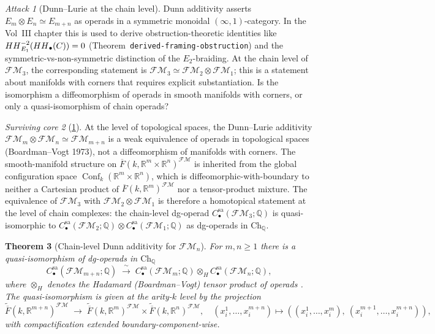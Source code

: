 \documentclass[11pt]{article}
\newtheorem{theorem}{Theorem}[section]
\theoremstyle{definition}
\theoremstyle{remark}
\newtheorem{attack}[theorem]{Attack}
\newtheorem{survivor}[theorem]{Surviving core}
\DeclareMathOperator{\Conf}{Conf}
\DeclareMathOperator{\HH}{HH}
\newcommand{\FMbar}{\overline{F}}
\newcommand{\FM}{\mathcal{FM}}
\newcommand{\Etwo}{E_2}
\begin{document}
\begin{attack}[Dunn--Lurie at the chain level]
\label{att:cycle-9}
Dunn additivity \cite[Dunn 1988; Lurie \emph{HA} 5.1.2.2]{Dunn1988, LurieHA}
asserts $E_m \otimes E_n \simeq E_{m+n}$ as operads in a symmetric
monoidal $(\infty, 1)$-category. In the Vol~III chapter this is used
to derive obstruction-theoretic identities like
$\HH^{-2}_{E_1}(\HH_\bullet(\cC)) = 0$ (Theorem~\texttt{derived-framing-obstruction})
and the symmetric-vs-non-symmetric distinction of the $\Etwo$-braiding.
At the chain level of $\FM_3$, the corresponding statement is
$\FM_3 \simeq \FM_2 \otimes \FM_1$; this is a statement about manifolds
with corners that requires explicit substantiation. Is the isomorphism
a diffeomorphism of operads in smooth manifolds with corners, or only
a quasi-isomorphism of chain operads?
\end{attack}

\begin{survivor}[\ref{att:cycle-9}]
At the level of topological spaces, the Dunn--Lurie additivity
$\FM_m \otimes \FM_n \simeq \FM_{m+n}$ is a weak equivalence of
operads in topological spaces (Boardman--Vogt 1973), not a
diffeomorphism of manifolds with corners. The smooth-manifold
structure on $\FMbar(k, \mathbb{R}^m \times \mathbb{R}^n)^{\FM}$
is inherited from the global configuration space
$\Conf_k(\mathbb{R}^m \times \mathbb{R}^n)$, which is
diffeomorphic-with-boundary to neither a Cartesian product of
$\FMbar(k, \mathbb{R}^m)^{\FM}$ nor a tensor-product mixture.
The equivalence of $\FM_3$ with $\FM_2 \otimes \FM_1$ is therefore a
homotopical statement at the level of chain complexes: the
chain-level dg-operad $C^{\mathrm{sa}}_\bullet(\FM_3; \mathbb{Q})$ is
quasi-isomorphic to $C^{\mathrm{sa}}_\bullet(\FM_2; \mathbb{Q}) \otimes
C^{\mathrm{sa}}_\bullet(\FM_1; \mathbb{Q})$ as dg-operads in
$\mathrm{Ch}_\mathbb{Q}$.
\end{survivor}

\begin{theorem}[Chain-level Dunn additivity for $\FM_n$]
\label{thm:fm-dunn}
For $m, n \geq 1$ there is a quasi-isomorphism of dg-operads in
$\mathrm{Ch}_\mathbb{Q}$
\[
 C^{\mathrm{sa}}_\bullet(\FM_{m+n}; \mathbb{Q})
 \;\xrightarrow{\ \sim\ }\;
 C^{\mathrm{sa}}_\bullet(\FM_m; \mathbb{Q}) \otimes_{H}
 C^{\mathrm{sa}}_\bullet(\FM_n; \mathbb{Q}),
\]
where $\otimes_H$ denotes the Hadamard (Boardman--Vogt) tensor
product of operads \cite[Boardman--Vogt 1973; Fresse 2017]{BoardmanVogt1973, Fresse2017}.
The quasi-isomorphism is given at the arity-$k$ level by the projection
\[
 \widetilde{\FMbar}(k, \mathbb{R}^{m+n})^{\FM}
 \;\longrightarrow\;
 \widetilde{\FMbar}(k, \mathbb{R}^m)^{\FM} \times
 \widetilde{\FMbar}(k, \mathbb{R}^n)^{\FM},
 \quad
 (x^1_i, \ldots, x^{m+n}_i) \mapsto
 \left((x^1_i, \ldots, x^m_i),\ (x^{m+1}_i, \ldots, x^{m+n}_i)\right),
\]
with compactification extended boundary-component-wise.
\end{theorem}
\end{document}
